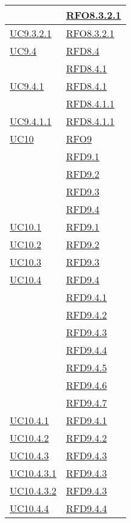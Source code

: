 \begin{longtable}{|>{\centering}m{5cm}|m{5cm}<{\centering}|}
& \hyperlink{RFO8.3.2.1}{RFO8.3.2.1}\\ \hline
\hyperref[UC9.3.2.1]{UC9.3.2.1} & \hyperlink{RFO8.3.2.1}{RFO8.3.2.1}\\ \hline
\hyperref[UC9.4]{UC9.4} & \hyperlink{RFD8.4}{RFD8.4}\\
& \hyperlink{RFD8.4.1}{RFD8.4.1}\\ \hline
\hyperref[UC9.4.1]{UC9.4.1} & \hyperlink{RFD8.4.1}{RFD8.4.1}\\
& \hyperlink{RFD8.4.1.1}{RFD8.4.1.1}\\ \hline
\hyperref[UC9.4.1.1]{UC9.4.1.1} & \hyperlink{RFD8.4.1.1}{RFD8.4.1.1}\\ \hline
\hyperref[UC10]{UC10} & \hyperlink{RFO9}{RFO9}\\
& \hyperlink{RFD9.1}{RFD9.1}\\
& \hyperlink{RFD9.2}{RFD9.2}\\
& \hyperlink{RFD9.3}{RFD9.3}\\
& \hyperlink{RFD9.4}{RFD9.4}\\ \hline
\hyperref[UC10.1]{UC10.1} & \hyperlink{RFD9.1}{RFD9.1}\\ \hline
\hyperref[UC10.2]{UC10.2} & \hyperlink{RFD9.2}{RFD9.2}\\ \hline
\hyperref[UC10.3]{UC10.3} & \hyperlink{RFD9.3}{RFD9.3}\\ \hline
\hyperref[UC10.4]{UC10.4} & \hyperlink{RFD9.4}{RFD9.4}\\
& \hyperlink{RFD9.4.1}{RFD9.4.1}\\
& \hyperlink{RFD9.4.2}{RFD9.4.2}\\
& \hyperlink{RFD9.4.3}{RFD9.4.3}\\
& \hyperlink{RFD9.4.4}{RFD9.4.4}\\
& \hyperlink{RFD9.4.5}{RFD9.4.5}\\
& \hyperlink{RFD9.4.6}{RFD9.4.6}\\
& \hyperlink{RFD9.4.7}{RFD9.4.7}\\ \hline
\hyperref[UC10.4.1]{UC10.4.1} & \hyperlink{RFD9.4.1}{RFD9.4.1}\\ \hline
\hyperref[UC10.4.2]{UC10.4.2} & \hyperlink{RFD9.4.2}{RFD9.4.2}\\ \hline
\hyperref[UC10.4.3]{UC10.4.3} & \hyperlink{RFD9.4.3}{RFD9.4.3}\\ \hline
\hyperref[UC10.4.3.1]{UC10.4.3.1} & \hyperlink{RFD9.4.3}{RFD9.4.3}\\ \hline
\hyperref[UC10.4.3.2]{UC10.4.3.2} & \hyperlink{RFD9.4.3}{RFD9.4.3}\\ \hline
\hyperref[UC10.4.4]{UC10.4.4} & \hyperlink{RFD9.4.4}{RFD9.4.4}\\ \hline

\end{longtable}
